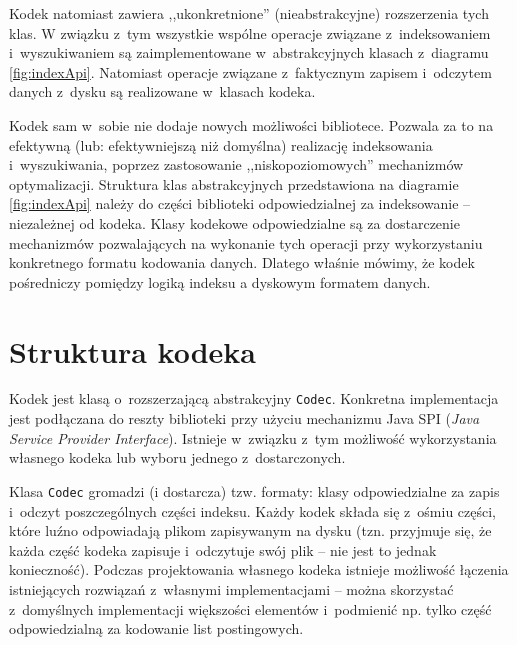Kodek natomiast zawiera ,,ukonkretnione'' (nieabstrakcyjne) rozszerzenia tych klas. W związku z~tym wszystkie wspólne operacje związane z~indeksowaniem i~wyszukiwaniem są zaimplementowane w~abstrakcyjnych klasach z~diagramu \ref{fig:indexApi}. Natomiast operacje związane z~faktycznym zapisem i~odczytem danych z~dysku są realizowane w~klasach kodeka. 

Kodek sam w~sobie nie dodaje nowych możliwości bibliotece. Pozwala za to na efektywną (lub: efektywniejszą niż domyślna) realizację indeksowania i~wyszukiwania, poprzez zastosowanie ,,niskopoziomowych'' mechanizmów optymalizacji. Struktura klas abstrakcyjnych przedstawiona na diagramie \ref{fig:indexApi} należy do części biblioteki odpowiedzialnej za indeksowanie -- niezależnej od kodeka. Klasy kodekowe odpowiedzialne są za dostarczenie mechanizmów pozwalających na wykonanie tych operacji przy wykorzystaniu konkretnego formatu kodowania danych. Dlatego właśnie mówimy, że kodek pośredniczy pomiędzy logiką indeksu a dyskowym formatem danych.

\section{Struktura kodeka}
\label{sec:codecStructure}

Kodek jest klasą o~rozszerzającą abstrakcyjny \texttt{Codec}. Konkretna implementacja jest podłączana do reszty biblioteki przy użyciu mechanizmu Java SPI (\emph{Java Service Provider Interface}). Istnieje w~związku z~tym możliwość wykorzystania własnego kodeka lub wyboru jednego z~dostarczonych.

Klasa \texttt{Codec} gromadzi (i dostarcza) tzw. formaty: klasy odpowiedzialne za zapis i~odczyt poszczególnych części indeksu. Każdy kodek składa się z~ośmiu części, które luźno odpowiadają plikom zapisywanym na dysku (tzn. przyjmuje się, że każda część kodeka zapisuje i~odczytuje swój plik -- nie jest to jednak konieczność). Podczas projektowania własnego kodeka istnieje możliwość łączenia istniejących rozwiązań z~własnymi implementacjami -- można skorzystać z~domyślnych implementacji większości elementów i~podmienić np. tylko część odpowiedzialną za kodowanie list postingowych.

